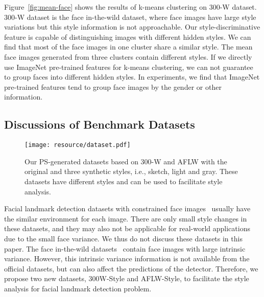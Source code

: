 \documentclass[10pt,twocolumn,letterpaper]{article}
\begin{document}
Figure~\ref{fig:mean-face} shows the results of k-means clustering on 300-W dataset.
300-W dataset is the face in-the-wild dataset, where face images have large style variations but this style information is not approachable.
Our style-discriminative feature is capable of distinguishing images with different hidden styles.
We can find that most of the face images in one cluster share a similar style.
The mean face images generated from three clusters contain different styles.
If we directly use ImageNet pre-trained features for k-means clustering, we can not guarantee to group faces into different hidden styles.
In experiments, we find that ImageNet pre-trained features tend to group face images by the gender or other information.



\subsection{Discussions of Benchmark Datasets}\label{sec:discussion}


\begin{figure}[t]
\center
\texttt{[image: resource/dataset.pdf]}
\caption{
Our PS-generated datasets based on 300-W and AFLW with the original and three synthetic styles, i.e., sketch, light and gray.
These datasets have different styles and can be used to facilitate style analysis.
}
\vspace{-2mm}
\label{fig:dataset}
\end{figure}


Facial landmark detection datasets with constrained face images~\cite{milborrow2010muct} usually have the similar environment for each image. There are only small style changes in these datasets, and they may also not be applicable for real-world applications due to the small face variance. We thus do not discuss these datasets in this paper.
The face in-the-wild datasets~\cite{sagonas2013300,koestinger2011annotated} contain face images with large intrinsic variance. However, this intrinsic variance information is not available from the official datasets, but can also affect the predictions of the detector.
Therefore, we propose two new datasets, 300W-Style and AFLW-Style, to facilitate the style analysis for facial landmark detection problem.
\end{document}
